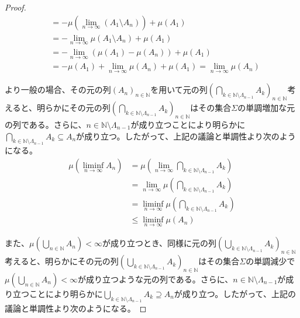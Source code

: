 \documentclass[dvipdfmx]{jsarticle}
\begin{document}
\begin{proof}
\begin{align*}
&= - \mu\left( \lim_{n \rightarrow \infty}\left( A_{1} \setminus A_{n} \right) \right) + \mu\left( A_{1} \right)\\
&= - \lim_{n \rightarrow \infty}{\mu\left( A_{1} \setminus A_{n} \right)} + \mu\left( A_{1} \right)\\
&= - \lim_{n \rightarrow \infty}\left( \mu\left( A_{1} \right) - \mu\left( A_{n} \right) \right) + \mu\left( A_{1} \right)\\
&= - \mu\left( A_{1} \right) + \lim_{n \rightarrow \infty}{\mu\left( A_{n} \right)} + \mu\left( A_{1} \right) = \lim_{n \rightarrow \infty}{\mu\left( A_{n} \right)}
\end{align*}\par
より一般の場合、その元の列$\left( A_{n} \right)_{n \in \mathbb{N}}$を用いて元の列$\left( \bigcap_{k \in \mathbb{N} \setminus \varLambda_{n - 1}} A_{k} \right)_{n \in \mathbb{N}}$考えると、明らかにその元の列$\left( \bigcap_{k \in \mathbb{N} \setminus \varLambda_{n - 1}} A_{k} \right)_{n \in \mathbb{N}}$はその集合$\varSigma$の単調増加な元の列である。さらに、$n \in \mathbb{N} \setminus \varLambda_{n - 1}$が成り立つことにより明らかに$\bigcap_{k \in \mathbb{N} \setminus \varLambda_{n - 1}} A_{k} \subseteq A_{n}$が成り立つ。したがって、上記の議論と単調性より次のようになる。
\begin{align*}
\mu\left( \liminf_{n \rightarrow \infty}A_{n} \right) &= \mu\left( \lim_{n \rightarrow \infty}{\bigcap_{k \in \mathbb{N} \setminus \varLambda_{n - 1}} A_{k}} \right)\\
&= \lim_{n \rightarrow \infty}{\mu\left( \bigcap_{k \in \mathbb{N} \setminus \varLambda_{n - 1}} A_{k} \right)}\\
&= \liminf_{n \rightarrow \infty}{\mu\left( \bigcap_{k \in \mathbb{N} \setminus \varLambda_{n - 1}} A_{k} \right)}\\
&\leq \liminf_{n \rightarrow \infty}{\mu\left( A_{n} \right)}
\end{align*}\par
また、$\mu\left( \bigcup_{n \in \mathbb{N}} A_{n} \right) < \infty$が成り立つとき、同様に元の列$\left( \bigcup_{k \in \mathbb{N} \setminus \varLambda_{n - 1}} A_{k} \right)_{n \in \mathbb{N}}$考えると、明らかにその元の列$\left( \bigcup_{k \in \mathbb{N} \setminus \varLambda_{n - 1}} A_{k} \right)_{n \in \mathbb{N}}$はその集合$\varSigma$の単調減少で$\mu\left( \bigcup_{n \in \mathbb{N}} A_{n} \right) < \infty$が成り立つような元の列である。さらに、$n \in \mathbb{N} \setminus \varLambda_{n - 1}$が成り立つことにより明らかに$\bigcup_{k \in \mathbb{N} \setminus \varLambda_{n - 1}} A_{k} \supseteq A_{n}$が成り立つ。したがって、上記の議論と単調性より次のようになる。

\end{proof}
\end{document}
